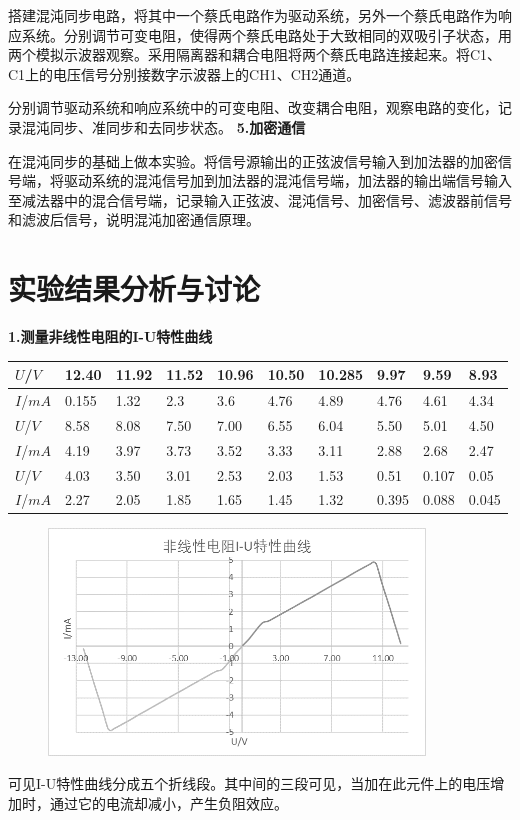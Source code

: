 \documentclass[UTF8]{ctexart}
\begin{document}
\begin{multicols}{2}
搭建混沌同步电路，将其中一个蔡氏电路作为驱动系统，另外一个蔡氏电路作为响应系统。分别调节可变电阻，使得两个蔡氏电路处于大致相同的双吸引子状态，用两个模拟示波器观察。采用隔离器和耦合电阻将两个蔡氏电路连接起来。将C1、C1上的电压信号分别接数字示波器上的CH1、CH2通道。

分别调节驱动系统和响应系统中的可变电阻、改变耦合电阻，观察电路的变化，记录混沌同步、准同步和去同步状态。
\newline\textbf{5.加密通信}

在混沌同步的基础上做本实验。将信号源输出的正弦波信号输入到加法器的加密信号端，将驱动系统的混沌信号加到加法器的混沌信号端，加法器的输出端信号输入至减法器中的混合信号端，记录输入正弦波、混沌信号、加密信号、滤波器前信号和滤波后信号，说明混沌加密通信原理。


\end{multicols}

\section{实验结果分析与讨论}
\noindent\textbf{1.测量非线性电阻的I-U特性曲线}
\begin{table}[H]
\tiny
\centering
\begin{tabular}{|l|l|l|l|l|l|l|l|l|l|}
\hline
$U$/$V$  & 12.40 & 11.92 & 11.52 & 10.96 & 10.50 & 10.285 & 9.97  & 9.59  & 8.93  \\ \hline
$I$/$mA$ & 0.155 & 1.32  & 2.3   & 3.6   & 4.76  & 4.89   & 4.76  & 4.61  & 4.34  \\ \hline
$U$/$V$  & 8.58  & 8.08  & 7.50  & 7.00  & 6.55  & 6.04   & 5.50  & 5.01  & 4.50  \\ \hline
$I$/$mA$ & 4.19  & 3.97  & 3.73  & 3.52  & 3.33  & 3.11   & 2.88  & 2.68  & 2.47  \\ \hline
$U$/$V$  & 4.03  & 3.50  & 3.01  & 2.53  & 2.03  & 1.53   & 0.51  & 0.107 & 0.05  \\ \hline
$I$/$mA$ & 2.27  & 2.05  & 1.85  & 1.65  & 1.45  & 1.32   & 0.395 & 0.088 & 0.045 \\ \hline
\end{tabular}
\end{table}
\begin{figure}[H]
\centering
\includegraphics[width=10cm]{U-I.png}
\end{figure}
可见I-U特性曲线分成五个折线段。其中间的三段可见，当加在此元件上的电压增加时，通过它的电流却减小，产生负阻效应。
\end{document}
